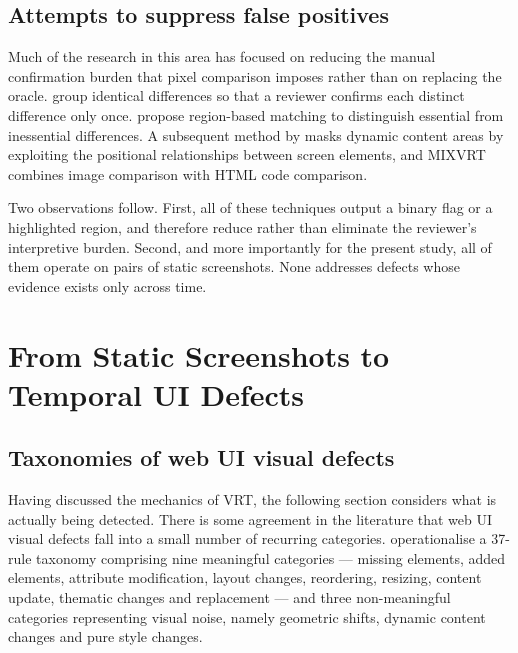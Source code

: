 \subsection{Attempts to suppress false positives}
\label{sec:vrt-suppression}

Much of the research in this area has focused on reducing the manual
confirmation burden that pixel comparison imposes rather than on replacing
the oracle. \citet{adachi2018reducing} group identical
differences so that a reviewer confirms each distinct difference only once.
\citet{tanno2020region} propose region-based matching to
distinguish essential from inessential differences. A subsequent method by
\citet{adachi2020masking} masks dynamic content areas by
exploiting the positional relationships between screen elements, and
MIXVRT~\citep{amano2021mixvrt} combines image comparison with HTML code
comparison.

Two observations follow. First, all of these techniques output a binary
flag or a highlighted region, and therefore reduce rather than eliminate
the reviewer's interpretive burden. Second, and more importantly for the
present study, all of them operate on pairs of static screenshots. None
addresses defects whose evidence exists only across time.


\section{From Static Screenshots to Temporal UI Defects}
\label{sec:temporal}

\subsection{Taxonomies of web UI visual defects}
\label{sec:temporal-taxonomy}

Having discussed the mechanics of VRT, the following section considers
what is actually being detected. There is some agreement in the literature
that web UI visual defects fall into a small number of recurring
categories. \citet{zhang2026beyond} operationalise a 37-rule
taxonomy comprising nine meaningful categories --- missing elements,
added elements, attribute modification, layout changes, reordering,
resizing, content update, thematic changes and replacement --- and three
non-meaningful categories representing visual noise, namely geometric
shifts, dynamic content changes and pure style changes.

